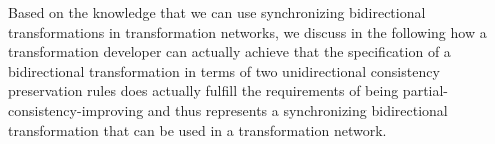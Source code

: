 Based on the knowledge that we can use synchronizing bidirectional transformations in transformation networks, we discuss in the following how a transformation developer can actually achieve that the specification of a bidirectional transformation in terms of two unidirectional consistency preservation rules does actually fulfill the requirements of being partial-consistency-improving and thus represents a synchronizing bidirectional transformation that can be used in a transformation network.







